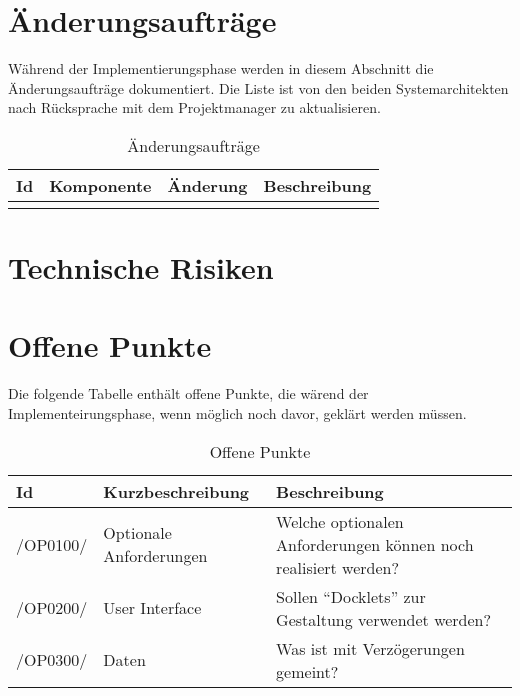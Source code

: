 \section{Änderungsaufträge}
\label{sec:9:change}

Während der Implementierungsphase werden in diesem Abschnitt die Änderungsaufträge dokumentiert. 
Die Liste ist von den beiden Systemarchitekten nach Rücksprache mit dem Projektmanager zu aktualisieren.

\begin{table}[htdp]
\caption{Änderungsaufträge}
\label{tab:aenderung}
\begin{center}
\begin{tabular}{|p{2cm}|p{3cm}|p{4.5cm}|p{5cm}|}
\hline
\textbf{Id} & \textbf{Komponente} & \textbf{Änderung} & \textbf{Beschreibung} \\
\hline
&&&\\
\hline
\end{tabular}
\end{center}
\label{default}
\end{table}

\section{Technische Risiken}
\label{sec:9:techrisk}

\section{Offene Punkte}
\label{sec:9:offen}

Die folgende Tabelle enthält offene Punkte, die wärend der Implementeirungsphase, wenn möglich noch davor, geklärt werden müssen.

\begin{table}[htdp]
\caption{Offene Punkte}
\label{tab:offeneP}
\begin{center}
\begin{tabular}{|p{2cm}|p{5cm}|p{8cm}|}
\hline
\textbf{Id} & \textbf{Kurzbeschreibung} & \textbf{Beschreibung}\\
\hline
 /OP0100/ & Optionale Anforderungen & Welche optionalen Anforderungen können noch realisiert werden?\\
\hline
 /OP0200/ & User Interface & Sollen "`Docklets"' zur Gestaltung verwendet
 werden?\\
 \hline
 /OP0300/ & Daten & Was ist mit Verzögerungen gemeint?\\
\hline
\end{tabular}
\end{center}
\label{default}
\end{table}

